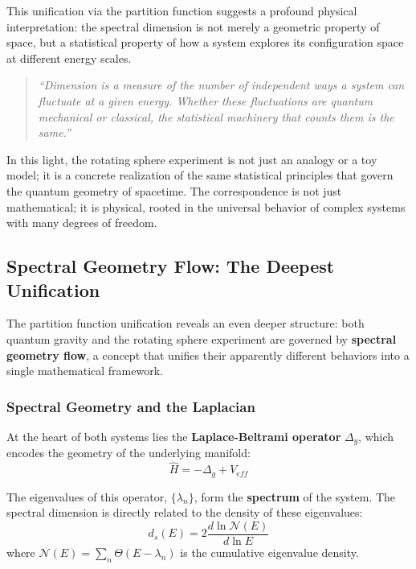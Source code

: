 \documentclass[12pt,a4paper]{article}
\begin{document}
This unification via the partition function suggests a profound physical interpretation: the spectral dimension is not merely a geometric property of space, but a statistical property of how a system explores its configuration space at different energy scales.

\begin{quote}
    \textit{``Dimension is a measure of the number of independent ways a system can fluctuate at a given energy. Whether these fluctuations are quantum mechanical or classical, the statistical machinery that counts them is the same.''}
\end{quote}

In this light, the rotating sphere experiment is not just an analogy or a toy model; it is a concrete realization of the same statistical principles that govern the quantum geometry of spacetime. The correspondence is not just mathematical; it is physical, rooted in the universal behavior of complex systems with many degrees of freedom.

\subsection{Spectral Geometry Flow: The Deepest Unification}

The partition function unification reveals an even deeper structure: both quantum gravity and the rotating sphere experiment are governed by \textbf{spectral geometry flow}, a concept that unifies their apparently different behaviors into a single mathematical framework.

\subsubsection{Spectral Geometry and the Laplacian}

At the heart of both systems lies the \textbf{Laplace-Beltrami operator} $\Delta_g$, which encodes the geometry of the underlying manifold:
\begin{equation}
    \hat{H} = -\Delta_g + V_{eff}
\end{equation}

The eigenvalues of this operator, $\{\lambda_n\}$, form the \textbf{spectrum} of the system. The spectral dimension is directly related to the density of these eigenvalues:
\begin{equation}
    d_s(E) = 2 \frac{d \ln \mathcal{N}(E)}{d \ln E}
\end{equation}
where $\mathcal{N}(E) = \sum_n \Theta(E - \lambda_n)$ is the cumulative eigenvalue density.
\end{document}
